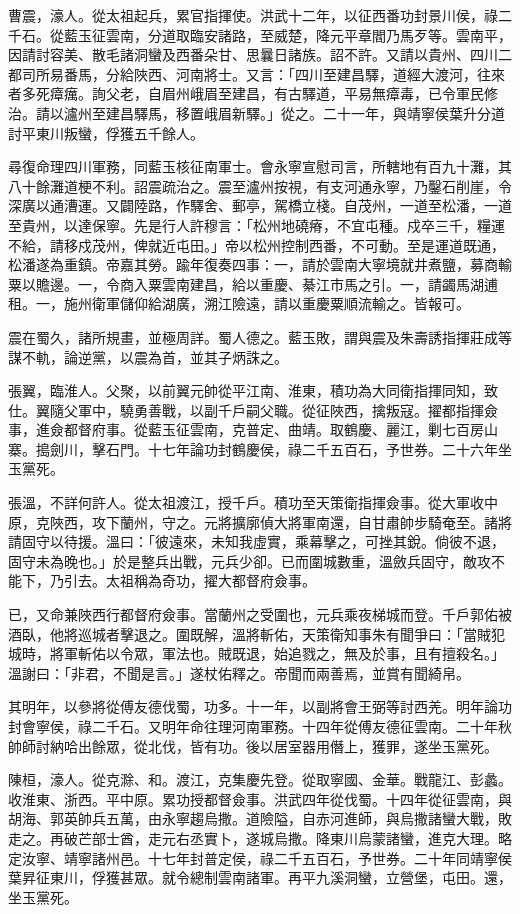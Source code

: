 \begin{pinyinscope}
曹震，濠人。從太祖起兵，累官指揮使。洪武十二年，以征西番功封景川侯，祿二千石。從藍玉征雲南，分道取臨安諸路，至威楚，降元平章閻乃馬歹等。雲南平，因請討容美、散毛諸洞蠻及西番朵甘、思曩日諸族。詔不許。又請以貴州、四川二都司所易番馬，分給陜西、河南將士。又言：「四川至建昌驛，道經大渡河，往來者多死瘴癘。詢父老，自眉州峨眉至建昌，有古驛道，平易無瘴毒，已令軍民修治。請以瀘州至建昌驛馬，移置峨眉新驛。」從之。二十一年，與靖寧侯葉升分道討平東川叛蠻，俘獲五千餘人。

尋復命理四川軍務，同藍玉核征南軍士。會永寧宣慰司言，所轄地有百九十灘，其八十餘灘道梗不利。詔震疏治之。震至瀘州按視，有支河通永寧，乃鑿石削崖，令深廣以通漕運。又闢陸路，作驛舍、郵亭，駕橋立棧。自茂州，一道至松潘，一道至貴州，以達保寧。先是行人許穆言：「松州地磽瘠，不宜屯種。戍卒三千，糧運不給，請移戍茂州，俾就近屯田。」帝以松州控制西番，不可動。至是運道既通，松潘遂為重鎮。帝嘉其勞。踰年復奏四事：一，請於雲南大寧境就井煮鹽，募商輸粟以贍邊。一，令商入粟雲南建昌，給以重慶、綦江市馬之引。一，請蠲馬湖逋租。一，施州衛軍儲仰給湖廣，溯江險遠，請以重慶粟順流輸之。皆報可。

震在蜀久，諸所規畫，並極周詳。蜀人德之。藍玉敗，謂與震及朱壽誘指揮莊成等謀不軌，論逆黨，以震為首，並其子炳誅之。

張翼，臨淮人。父聚，以前翼元帥從平江南、淮東，積功為大同衛指揮同知，致仕。翼隨父軍中，驍勇善戰，以副千戶嗣父職。從征陜西，擒叛寇。擢都指揮僉事，進僉都督府事。從藍玉征雲南，克普定、曲靖。取鶴慶、麗江，剿七百房山寨。搗劍川，擊石門。十七年論功封鶴慶侯，祿二千五百石，予世券。二十六年坐玉黨死。

張溫，不詳何許人。從太祖渡江，授千戶。積功至天策衛指揮僉事。從大軍收中原，克陜西，攻下蘭州，守之。元將擴廓偵大將軍南還，自甘肅帥步騎奄至。諸將請固守以待援。溫曰：「彼遠來，未知我虛實，乘幕擊之，可挫其銳。倘彼不退，固守未為晚也。」於是整兵出戰，元兵少卻。已而圍城數重，溫斂兵固守，敵攻不能下，乃引去。太祖稱為奇功，擢大都督府僉事。

已，又命兼陜西行都督府僉事。當蘭州之受圍也，元兵乘夜梯城而登。千戶郭佑被酒臥，他將巡城者擊退之。圍既解，溫將斬佑，天策衛知事朱有聞爭曰：「當賊犯城時，將軍斬佑以令眾，軍法也。賊既退，始追戮之，無及於事，且有擅殺名。」溫謝曰：「非君，不聞是言。」遂杖佑釋之。帝聞而兩善焉，並賞有聞綺帛。

其明年，以參將從傅友德伐蜀，功多。十一年，以副將會王弼等討西羌。明年論功封會寧侯，祿二千石。又明年命往理河南軍務。十四年從傅友德征雲南。二十年秋帥師討納哈出餘眾，從北伐，皆有功。後以居室器用僭上，獲罪，遂坐玉黨死。

陳桓，濠人。從克滁、和。渡江，克集慶先登。從取寧國、金華。戰龍江、彭蠡。收淮東、浙西。平中原。累功授都督僉事。洪武四年從伐蜀。十四年從征雲南，與胡海、郭英帥兵五萬，由永寧趨烏撒。道險隘，自赤河進師，與烏撒諸蠻大戰，敗走之。再破芒部士酋，走元右丞實卜，遂城烏撒。降東川烏蒙諸蠻，進克大理。略定汝寧、靖寧諸州邑。十七年封普定侯，祿二千五百石，予世券。二十年同靖寧侯葉昇征東川，俘獲甚眾。就令總制雲南諸軍。再平九溪洞蠻，立營堡，屯田。還，坐玉黨死。


\end{pinyinscope}
